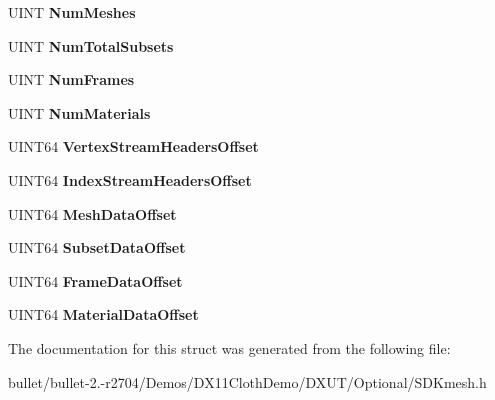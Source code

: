 \begin{DoxyCompactItemize}
\item 
\hypertarget{struct_s_d_k_m_e_s_h___h_e_a_d_e_r_a1dba3a6531ee8879a81bb04e694a974b}{U\+I\+N\+T {\bfseries Num\+Meshes}}\label{struct_s_d_k_m_e_s_h___h_e_a_d_e_r_a1dba3a6531ee8879a81bb04e694a974b}

\item 
\hypertarget{struct_s_d_k_m_e_s_h___h_e_a_d_e_r_ae50703699f1cc6c2103398bed810f87a}{U\+I\+N\+T {\bfseries Num\+Total\+Subsets}}\label{struct_s_d_k_m_e_s_h___h_e_a_d_e_r_ae50703699f1cc6c2103398bed810f87a}

\item 
\hypertarget{struct_s_d_k_m_e_s_h___h_e_a_d_e_r_ab9e9a4b7cab57c51ba1741582adea2eb}{U\+I\+N\+T {\bfseries Num\+Frames}}\label{struct_s_d_k_m_e_s_h___h_e_a_d_e_r_ab9e9a4b7cab57c51ba1741582adea2eb}

\item 
\hypertarget{struct_s_d_k_m_e_s_h___h_e_a_d_e_r_aca3d6f8db5269323eecc79b9c0cb6a24}{U\+I\+N\+T {\bfseries Num\+Materials}}\label{struct_s_d_k_m_e_s_h___h_e_a_d_e_r_aca3d6f8db5269323eecc79b9c0cb6a24}

\item 
\hypertarget{struct_s_d_k_m_e_s_h___h_e_a_d_e_r_aa93b9805ceaf6c95010b78976cadc602}{U\+I\+N\+T64 {\bfseries Vertex\+Stream\+Headers\+Offset}}\label{struct_s_d_k_m_e_s_h___h_e_a_d_e_r_aa93b9805ceaf6c95010b78976cadc602}

\item 
\hypertarget{struct_s_d_k_m_e_s_h___h_e_a_d_e_r_ae33332bc4795630cece7cd8ffee6b57f}{U\+I\+N\+T64 {\bfseries Index\+Stream\+Headers\+Offset}}\label{struct_s_d_k_m_e_s_h___h_e_a_d_e_r_ae33332bc4795630cece7cd8ffee6b57f}

\item 
\hypertarget{struct_s_d_k_m_e_s_h___h_e_a_d_e_r_af203e6f97538fc6c35889b323da903fd}{U\+I\+N\+T64 {\bfseries Mesh\+Data\+Offset}}\label{struct_s_d_k_m_e_s_h___h_e_a_d_e_r_af203e6f97538fc6c35889b323da903fd}

\item 
\hypertarget{struct_s_d_k_m_e_s_h___h_e_a_d_e_r_ac4fb51cfa458ebe00c5d7d3e9aacb566}{U\+I\+N\+T64 {\bfseries Subset\+Data\+Offset}}\label{struct_s_d_k_m_e_s_h___h_e_a_d_e_r_ac4fb51cfa458ebe00c5d7d3e9aacb566}

\item 
\hypertarget{struct_s_d_k_m_e_s_h___h_e_a_d_e_r_a7660f3982ed3ba0166a68924dde14a3e}{U\+I\+N\+T64 {\bfseries Frame\+Data\+Offset}}\label{struct_s_d_k_m_e_s_h___h_e_a_d_e_r_a7660f3982ed3ba0166a68924dde14a3e}

\item 
\hypertarget{struct_s_d_k_m_e_s_h___h_e_a_d_e_r_afd735fd42679f715b75d10b5dfb513bc}{U\+I\+N\+T64 {\bfseries Material\+Data\+Offset}}\label{struct_s_d_k_m_e_s_h___h_e_a_d_e_r_afd735fd42679f715b75d10b5dfb513bc}

\end{DoxyCompactItemize}


The documentation for this struct was generated from the following file\+:\begin{DoxyCompactItemize}
\item 
bullet/bullet-\/2.-\/r2704/\+Demos/\+D\+X11\+Cloth\+Demo/\+D\+X\+U\+T/\+Optional/S\+D\+Kmesh.\+h\end{DoxyCompactItemize}
